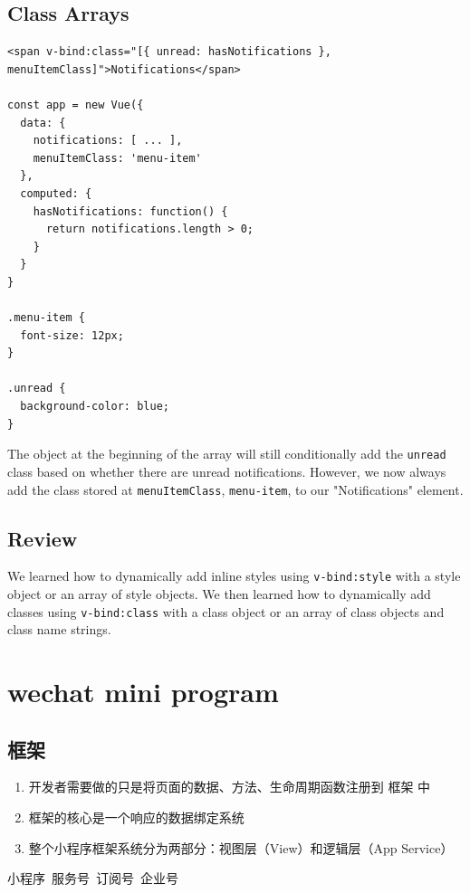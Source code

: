 \documentclass[a4paper, 12pt]{article}
\begin{document}
\subsection{Class Arrays}
\begin{verbatim}
<span v-bind:class="[{ unread: hasNotifications }, menuItemClass]">Notifications</span>

const app = new Vue({
  data: { 
    notifications: [ ... ],
    menuItemClass: 'menu-item'
  },
  computed: {
    hasNotifications: function() {
      return notifications.length > 0;
    }
  }
}

.menu-item {
  font-size: 12px;
}

.unread {
  background-color: blue;
}
\end{verbatim}
The object at the beginning of the array will still conditionally add the \verb|unread| class based on whether there are unread notifications. However, we now always add the class stored at \verb|menuItemClass|, \verb|menu-item|, to our "Notifications" element.

\subsection{Review}
We learned how to dynamically add inline styles using \verb|v-bind:style| with a style object or an array of style objects. We then learned how to dynamically add classes using \verb|v-bind:class| with a class object or an array of class objects and class name strings.



\section{wechat mini program}
\subsection{框架}
\begin{enumerate}

\item 开发者需要做的只是将页面的数据、方法、生命周期函数注册到 框架 中

\item 框架的核心是一个响应的数据绑定系统
\item 整个小程序框架系统分为两部分：视图层（View）和逻辑层（App Service）
\end{enumerate}

\vspace{2in}
小程序~服务号~订阅号~企业号
\end{document}
